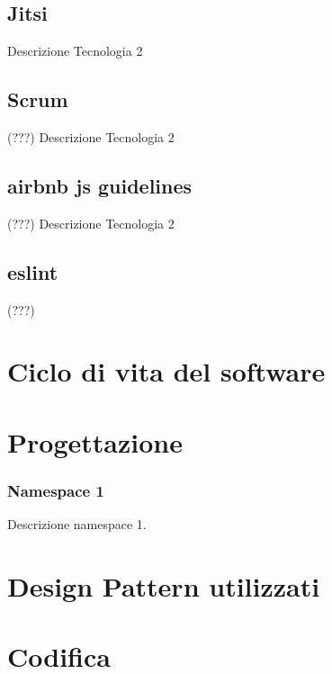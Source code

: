 \subsection*{Jitsi}
Descrizione Tecnologia 2

\subsection*{Scrum} (???)
Descrizione Tecnologia 2

\subsection*{airbnb js guidelines} (???)
Descrizione Tecnologia 2

\subsection*{eslint} (???)

\section{Ciclo di vita del software}
\label{sec:ciclo-vita-software}

\section{Progettazione}
\label{sec:progettazione}

\subsubsection{Namespace 1} %
Descrizione namespace 1.

\begin{namespacedesc}
\end{namespacedesc}


\section{Design Pattern utilizzati}

\section{Codifica}
